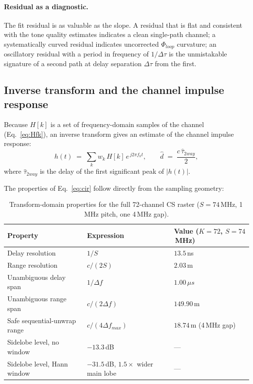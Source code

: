 \documentclass[11pt,a4paper]{article}
\newcommand{\us}{\,\ensuremath{\upmu}s}
\providecommand{\upmu}{\mu}
\begin{document}
\paragraph{Residual as a diagnostic.} The fit residual is as valuable as the slope. A residual that is
flat and consistent with the tone quality estimates indicates a clean single-path channel; a
systematically curved residual indicates uncorrected $\Phi_{loop}$ curvature; an oscillatory residual
with a period in frequency of $1/\Delta\tau$ is the unmistakable signature of a second path at delay
separation $\Delta\tau$ from the first.

\subsection{Inverse transform and the channel impulse response}
\label{sec:ifft}

Because $H[k]$ is a set of frequency-domain samples of the channel (Eq.~\eqref{eq:Hfk}), an inverse
transform gives an estimate of the channel impulse response:
\begin{equation}
h(t) \;=\; \sum_k w_k\, H[k]\, e^{\,j 2\pi f_k t},
\qquad
\hat d \;=\; \frac{c\,\hat\tau_{2way}}{2},
\label{eq:cir}
\end{equation}
where $\hat\tau_{2way}$ is the delay of the first significant peak of $|h(t)|$.

The properties of Eq.~\eqref{eq:cir} follow directly from the sampling geometry:

\begin{table}[h]
\caption{Transform-domain properties for the full 72-channel CS raster ($S=74$\,MHz, 1\,MHz pitch, one 4\,MHz gap).}
\label{tab:transform}
\centering\small
\begin{tabular}{@{}L{50mm}L{40mm}L{40mm}@{}}
\toprule
Property & Expression & Value ($K=72$, $S=74$\,MHz) \\
\midrule
Delay resolution & $1/S$ & $13.5$\,ns \\
Range resolution & $c/(2S)$ & $2.03$\,m \\
Unambiguous delay span & $1/\Delta f$ & $1.00\us$ \\
Unambiguous range span & $c/(2\Delta f)$ & $149.90$\,m \\
Safe sequential-unwrap range & $c/(4\Delta f_{max})$ & $18.74$\,m (4\,MHz gap) \\
Sidelobe level, no window & $-13.3$\,dB & --- \\
Sidelobe level, Hann window & $-31.5$\,dB, $1.5\times$ wider main lobe & --- \\
\bottomrule
\end{tabular}
\end{table}
\end{document}
